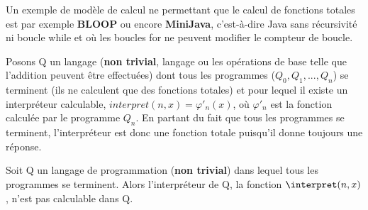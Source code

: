 \begin{myexem}
Un exemple de modèle de calcul ne permettant que le calcul de fonctions totales est par exemple \textbf{BLOOP} ou encore \textbf{MiniJava}, c'est-à-dire Java sans récursivité ni boucle while et où les boucles for ne peuvent modifier le compteur de boucle.
\end{myexem}

Posons Q un langage (\textbf{non trivial}, langage ou les opérations de base telle que l'addition peuvent être effectuées) dont tous les programmes ($Q_0, Q_1, ..., Q_n$) se terminent (ils ne calculent que des fonctions totales) et pour lequel il existe un interpréteur calculable, $interpret(n,x){} =\varphi'_n(x)$, où 
$\varphi'_n$ est la fonction calculée par le programme $Q_n$. En partant du fait que tous les programmes se terminent, l'interpréteur est donc une fonction totale puisqu'il donne toujours une réponse.

\begin{mytheo}
	\label{Hoare_Allison}
Soit Q un langage de programmation (\textbf{non trivial}) dans lequel tous les programmes se terminent.	Alors l'interpréteur de Q, la fonction $\interpret(n,x)$, n'est pas calculable dans Q.
\end{mytheo}

